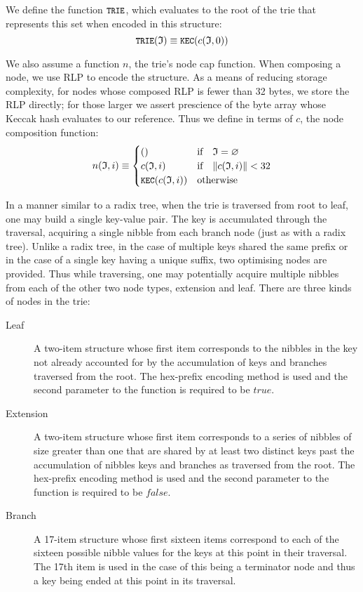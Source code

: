 \documentclass[9pt,oneside]{amsart}
\begin{document}
We define the function $\texttt{\small TRIE}$, which evaluates to the root of the trie that represents this set when encoded in this structure:
\begin{equation}
\texttt{\small TRIE}(\mathfrak{I}) \equiv \texttt{\small KEC}(c(\mathfrak{I}, 0))
\end{equation}

We also assume a function $n$, the trie's node cap function. When composing a node, we use RLP to encode the structure. As a means of reducing storage complexity, for nodes whose composed RLP is fewer than 32 bytes, we store the RLP directly; for those larger we assert prescience of the byte array whose Keccak hash evaluates to our reference. Thus we define in terms of $c$, the node composition function:
\begin{equation}
n(\mathfrak{I}, i) \equiv \begin{cases}
() & \text{if} \quad \mathfrak{I} = \varnothing \\
c(\mathfrak{I}, i) & \text{if} \quad \lVert c(\mathfrak{I}, i)\rVert < 32 \\
\texttt{\small KEC}(c(\mathfrak{I}, i)) & \text{otherwise}
\end{cases}
\end{equation}

In a manner similar to a radix tree, when the trie is traversed from root to leaf, one may build a single key-value pair. The key is accumulated through the traversal, acquiring a single nibble from each branch node (just as with a radix tree). Unlike a radix tree, in the case of multiple keys shared the same prefix or in the case of a single key having a unique suffix, two optimising nodes are provided. Thus while traversing, one may potentially acquire multiple nibbles from each of the other two node types, extension and leaf. There are three kinds of nodes in the trie:
\begin{description}
\item[Leaf] A two-item structure whose first item corresponds to the nibbles in the key not already accounted for by the accumulation of keys and branches traversed from the root. The hex-prefix encoding method is used and the second parameter to the function is required to be $true$.
\item[Extension] A two-item structure whose first item corresponds to a series of nibbles of size greater than one that are shared by at least two distinct keys past the accumulation of nibbles keys and branches as traversed from the root. The hex-prefix encoding method is used and the second parameter to the function is required to be $false$.
\item[Branch] A 17-item structure whose first sixteen items correspond to each of the sixteen possible nibble values for the keys at this point in their traversal. The 17th item is used in the case of this being a terminator node and thus a key being ended at this point in its traversal.
\end{description}
\end{document}
